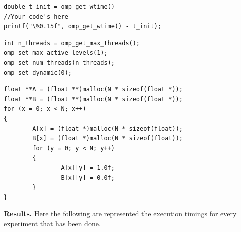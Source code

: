 \documentclass[conference]{IEEEtran}
\newcommand{\mypar}[1]{{\bf #1.}}
\begin{document}
\renewcommand{\lstlistingname}{Algorithm}

\begin{lstlisting}[caption={An example of code for obtaining the execution timing},label={lst:omp-get-time-alg}]
double t_init = omp_get_wtime()
//Your code's here
printf("\%0.15f", omp_get_wtime() - t_init);
\end{lstlisting}

\begin{lstlisting}[caption={OpenMP Configs},label={lst:omp-configs-alg}]
int n_threads = omp_get_max_threads();
omp_set_max_active_levels(1);
omp_set_num_threads(n_threads);
omp_set_dynamic(0);
\end{lstlisting}

\begin{lstlisting}[caption={A and B matrices initialization},label={lst:initialization-alg}]
float **A = (float **)malloc(N * sizeof(float *));
float **B = (float **)malloc(N * sizeof(float *));
for (x = 0; x < N; x++)
{
		A[x] = (float *)malloc(N * sizeof(float));
		B[x] = (float *)malloc(N * sizeof(float));
		for (y = 0; y < N; y++)
		{
				A[x][y] = 1.0f;
				B[x][y] = 0.0f;
		}
}
\end{lstlisting}

\mypar{Results}
Here the following are represented the execution timings for every experiment that has been done.
\end{document}
